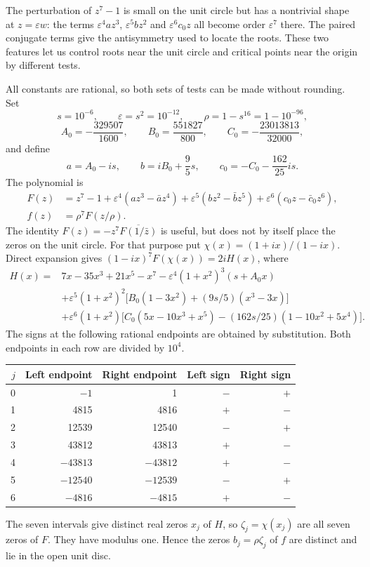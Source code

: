 The perturbation of $z^7-1$ is small on the unit circle but has a
nontrivial shape at $z=\varepsilon w$: the terms
$\varepsilon^4az^3$, $\varepsilon^5bz^2$ and
$\varepsilon^6c_0z$ all become order $\varepsilon^7$ there.
The paired conjugate terms give the antisymmetry used to locate the
roots. These two features let us control roots near the unit circle
and critical points near the origin by different tests.

All constants are rational, so both sets of tests can be made without
rounding. Set
\[
 s=10^{-6},\qquad \varepsilon=s^2=10^{-12},\qquad
 \rho=1-s^{16}=1-10^{-96},
\]
\[
 A_0=-\frac{329507}{1600},\qquad B_0=\frac{551827}{800},\qquad
 C_0=-\frac{23013813}{32000},
\]
and define
\[
 a=A_0-is,\qquad b=iB_0+\frac95s,\qquad
 c_0=-C_0-\frac{162}{25}is.
\]
The polynomial is
\begin{align}
 F(z)&=z^7-1+\varepsilon^4(az^3-\bar a z^4)
       +\varepsilon^5(bz^2-\bar b z^5)
       +\varepsilon^6(c_0z-\bar c_0z^6),\label{eq:ani-F-long}\\
 f(z)&=\rho^7 F(z/\rho).\label{eq:ani-f-long}
\end{align}
The identity $F(z)=-z^7\overline{F(1/\bar z)}$ is useful, but does not by
itself place the zeros on the unit circle. For that purpose put
$\chi(x)=(1+ix)/(1-ix)$. Direct expansion gives
$(1-ix)^7 F(\chi(x))=2iH(x)$, where
\begin{align*}
 H(x)={}&7x-35x^3+21x^5-x^7
 -\varepsilon^4(1+x^2)^3(s+A_0x)\\
 &+\varepsilon^5(1+x^2)^2
       \bigl[B_0(1-3x^2)+(9s/5)(x^3-3x)\bigr]\\
 &+\varepsilon^6(1+x^2)
       \bigl[C_0(5x-10x^3+x^5)
          -(162s/25)(1-10x^2+5x^4)\bigr].
\end{align*}
The signs at the following rational endpoints are obtained by substitution.
Both endpoints in each row are divided by $10^4$.
\begin{center}
\begin{tabular}{@{}rrrrr@{}}
\toprule
$j$ & Left endpoint & Right endpoint & Left sign & Right sign\\
\midrule
0&$-1$&1&$-$&$+$\\
1&4815&4816&$+$&$-$\\
2&12539&12540&$-$&$+$\\
3&43812&43813&$+$&$-$\\
4&$-43813$&$-43812$&$+$&$-$\\
5&$-12540$&$-12539$&$-$&$+$\\
6&$-4816$&$-4815$&$+$&$-$\\
\bottomrule
\end{tabular}
\end{center}
The seven intervals give distinct real zeros $x_j$ of $H$, so
$\zeta_j=\chi(x_j)$ are all seven zeros of $F$. They have modulus one.
Hence the zeros $b_j=\rho\zeta_j$ of $f$ are distinct and lie in the open
unit disc.

